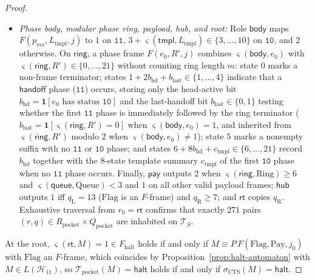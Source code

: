 \documentclass[11pt,reqno]{amsart}
\numberwithin{equation}{section}
\theoremstyle{plain}
\theoremstyle{definition}
\theoremstyle{remark}
\newcommand{\TS}{\mathcal{T}_S}
\begin{document}
\begin{proof}
\begin{itemize}[leftmargin=2.0em]
  \item \emph{Phase body, modular phase ring, payload, hub, and root:} Role $\mathsf{body}$ maps $F(p_{\mathrm{ver}}, L_{\mathrm{tmpl}}, j)$ to $1$ on $\mathtt{11}$, $3 + \varsigma(\mathsf{tmpl}, L_{\mathrm{tmpl}}) \in \{3,\dots,10\}$ on $\mathtt{10}$, and $2$ otherwise. On $\mathsf{ring}$, a phase frame $F(e_0, R', j)$ combines $\varsigma(\mathsf{body}, e_0)$ with $\varsigma(\mathsf{ring}, R') \in \{0,\dots,21\}$ without counting ring length $m$: state $0$ marks a non-frame terminator; states $1 + 2 b_{\mathrm{hd}} + b_{\mathrm{last}} \in \{1,\dots,4\}$ indicate that a $\mathsf{handoff}$ phase ($\mathtt{11}$) occurs, storing only the head-active bit $b_{\mathrm{hd}} = \mathbf{1}[e_0\text{ has status }\mathtt{10}]$ and the last-handoff bit $b_{\mathrm{last}} \in \{0,1\}$ testing whether the first $\mathtt{11}$ phase is immediately followed by the ring terminator ($b_{\mathrm{last}} = \mathbf{1}[\varsigma(\mathsf{ring}, R') = 0]$ when $\varsigma(\mathsf{body}, e_0) = 1$, and inherited from $\varsigma(\mathsf{ring}, R')$ modulo $2$ when $\varsigma(\mathsf{body}, e_0) \ne 1$); state $5$ marks a nonempty suffix with no $\mathtt{11}$ or $\mathtt{10}$ phase; and states $6 + 8 b_{\mathrm{hd}} + c_{\mathrm{tmpl}} \in \{6,\dots,21\}$ record $b_{\mathrm{hd}}$ together with the $8$-state template summary $c_{\mathrm{tmpl}}$ of the first $\mathtt{10}$ phase when no $\mathtt{11}$ phase occurs. Finally, $\mathsf{pay}$ outputs $2$ when $\varsigma(\mathsf{ring}, \mathrm{Ring}) \ge 6$ and $\varsigma(\mathsf{queue}, \mathrm{Queue}) < 3$ and $1$ on all other valid payload frames; $\mathsf{hub}$ outputs $1$ iff $q_{\mathrm{L}} = 13$ ($\mathrm{Flag}$ is an $F$-frame) and $q_{\mathrm{R}} \ge 7$; and $\mathsf{rt}$ copies $q_{\mathrm{R}}$. Exhaustive traversal from $r_0 = \mathsf{rt}$ confirms that exactly $271$ pairs $(r, q) \in R_{\mathrm{pocket}} \times Q_{\mathrm{pocket}}$ are inhabited on $\TS$.
\end{itemize}

At the root, $\varsigma(\mathsf{rt}, M) = 1 \in F_{\mathrm{halt}}$ holds if and only if $M \equiv P\,F(\mathrm{Flag}, \mathrm{Pay}, j_0)$ with $\mathrm{Flag}$ an $F$-frame, which coincides by Proposition~\ref{prop:halt-automaton} with $M \in L(\mathcal{H}_{11})$, so $\mathcal{T}_{\mathrm{pocket}}(M) = \mathsf{halt}$ holds if and only if $\sigma_{\mathrm{CTS}}(M) = \mathsf{halt}$.


\end{proof}
\end{document}

